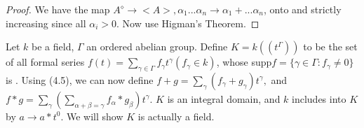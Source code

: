 \begin{proof} %
We have the map $A^\diamond \rightarrow <A>, \alpha_1...\alpha_n \rightarrow \alpha_1+...\alpha_n$, onto and strictly increasing since all $\alpha_i >0$. Now use Higman's Theorem.
\end{proof}


Let $k$ be a field, $\Gamma$ an ordered abelian group. Define $K=k((t^\Gamma))$ to be the set of all formal series $f(t)=\sum_{\gamma \in \Gamma} f_\gamma t^\gamma (f_\gamma \in k)$, whose  supp$f=\{\gamma \in \Gamma: f_\gamma \neq 0\}$ is . Using (4.5), we can now define $f+g=\sum_{\gamma} (f_\gamma + g_\gamma)t^\gamma,$ and $f*g= \sum_{\gamma} (\sum_{\alpha+\beta=\gamma} f_\alpha * g_\beta)t^\gamma$. $K$ is an integral domain, and $k$ includes into $K$ by $a \rightarrow a*t^0$. We will show $K$ is actually a field.

